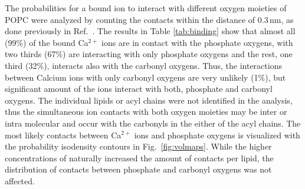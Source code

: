 \documentclass[aip,jcp,twocolumn]{revtex4}
\begin{document}
The probabilities for a bound  ion to interact with
different oxygen moieties of POPC 
were analyzed by counting the contacts within the distance of $0.3 \, \mathrm{nm}$, 
as done previously in Ref.~. 
%
%
%
The results in Table \ref{tab:binding} show that almost all (99\%) of the 
bound Ca$^{2+}$ ions are in contact with the phosphate oxygens,
with two thirds (67\%) are interacting with only phosphate oxygens
and the rest, one third (32\%), interacts also with the carbonyl oxygens. 
Thus, the interactions between
Calcium ions with only carbonyl oxygens are very unlikely (1\%), but significant
amount of the ions interact with both, phosphate and carbonyl oxygens.
The individual lipids or acyl chains were not identified in the analysis,
thus the simultaneous ion contacts with both oxygen moieties may be inter or intra molecular
and occur with the carbonyls in the either of the acyl chains.
The most likely contacts between Ca$^{2+}$ ions and phosphate oxygens is visualized with
the probability isodensity contours in Fig.~\ref{fig:volmaps}.
While the higher concentrations of  naturally increased the amount of contacts per lipid,
the distribution of contacts between phosphate and carbonyl oxygens was not affected.
\end{document}

